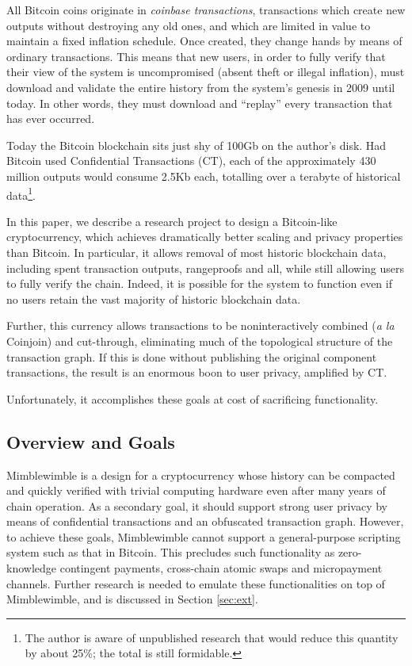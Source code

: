 \documentclass[letterpaper]{article}
\begin{document}
All Bitcoin coins originate in \emph{coinbase transactions}, transactions which
create new outputs without destroying any old ones, and which are limited in
value to maintain a fixed inflation schedule. Once created, they change hands
by means of ordinary transactions. This means that new users, in order to
fully verify that their view of the system is uncompromised (absent theft or
illegal inflation), must download and validate the entire history from the
system's genesis in 2009 until today. In other words, they must download
and ``replay'' every transaction that has ever occurred.

Today the Bitcoin blockchain sits just shy of 100Gb on the author's disk.
Had Bitcoin used Confidential Transactions\cite{maxwell2015} (CT), each of the
approximately 430 million outputs would consume 2.5Kb each, totalling over
a terabyte of historical data\footnote{The author is aware of unpublished
research that would reduce this quantity by about 25\%; the total is still
formidable.}.

In this paper, we describe a research project to design a Bitcoin-like
cryptocurrency, which achieves dramatically better scaling and privacy
properties than Bitcoin. In particular, it allows removal of most historic
blockchain data, including spent transaction outputs, rangeproofs and all,
while still allowing users to fully verify the chain. Indeed, it is
possible for the system to function even if no users retain the vast
majority of historic blockchain data.

Further, this currency allows transactions to be noninteractively
combined (\emph{a la} Coinjoin\cite{maxwell2013}) and cut-through\cite{maxwell2013-2},
eliminating much of the topological structure of the transaction graph.
If this is done without publishing the original component transactions,
the result is an enormous boon to user privacy, amplified by CT.

Unfortunately, it accomplishes these goals at cost of sacrificing functionality.

\subsection{Overview and Goals}

Mimblewimble is a design for a cryptocurrency whose history can be
compacted and quickly verified with trivial computing hardware even
after many years of chain operation. As a secondary goal, it should
support strong user privacy by means of confidential transactions
and an obfuscated transaction graph. However, to achieve these goals,
Mimblewimble cannot support a general-purpose scripting system such
as that in Bitcoin. This precludes such functionality as zero-knowledge
contingent payments\cite{maxwell2016}, cross-chain atomic swaps\cite{nolan2013}
and micropayment channels\cite{poon+dryja2016}. Further research is
needed to emulate these functionalities on top of Mimblewimble, and
is discussed in Section \ref{sec:ext}.
\end{document}
